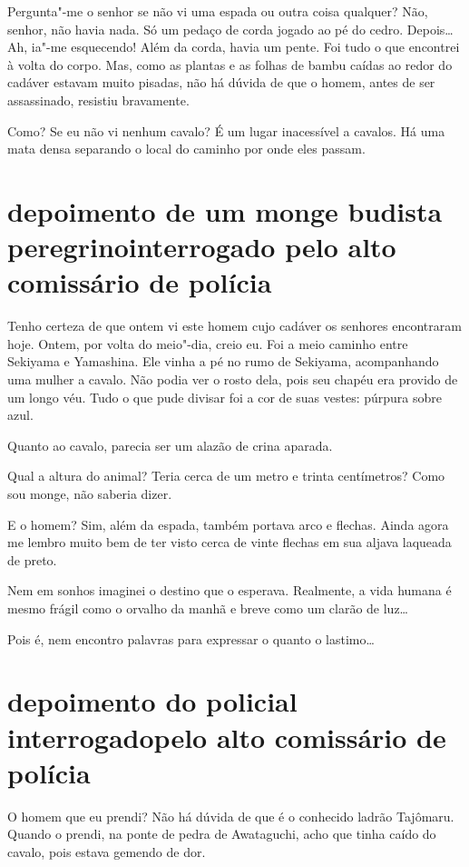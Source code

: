 Pergunta"-me o senhor se não vi uma espada ou outra coisa qualquer? Não,
senhor, não havia nada. Só um pedaço de corda jogado ao pé do cedro.
Depois\ldots{} Ah, ia"-me esquecendo! Além da corda, havia um pente. Foi tudo
o que encontrei à volta do corpo. Mas, como as plantas e as folhas de
bambu caídas ao redor do cadáver estavam muito pisadas, não há dúvida
de que o homem, antes de ser assassinado, resistiu bravamente. 

Como? Se eu não vi nenhum cavalo? É um lugar inacessível a cavalos. Há
uma mata densa separando o local do caminho por onde eles passam.

\section*{depoimento de um monge budista peregrino\break interrogado pelo alto
comissário de polícia}

Tenho certeza de que ontem vi este homem cujo cadáver os senhores
encontraram hoje. Ontem, por volta do meio"-dia, creio eu. Foi a meio
caminho entre Sekiyama e Yamashina. Ele vinha a pé no rumo de Sekiyama,
acompanhando uma mulher a cavalo. Não podia ver o rosto dela, pois seu
chapéu era provido de um longo véu. Tudo o que pude divisar foi a cor
de suas vestes: púrpura sobre azul. 

Quanto ao cavalo, parecia ser um alazão de crina aparada.

Qual a altura do animal? Teria cerca de um metro e trinta centímetros?
Como sou monge, não saberia dizer.

E o homem? Sim, além da espada, também portava arco e flechas. Ainda
agora me lembro muito bem de ter visto cerca de vinte flechas em sua
aljava laqueada de preto.

Nem em sonhos imaginei o destino que o esperava. Realmente, a vida
humana é mesmo frágil como o orvalho da manhã e breve como um clarão de
luz\ldots{} 

Pois é, nem encontro palavras para expressar o quanto o lastimo\ldots{}

\section*{depoimento do policial interrogado\break pelo alto comissário de polícia}

O homem que eu prendi? Não há dúvida de que é o conhecido ladrão
Tajômaru. Quando o prendi, na ponte de pedra de Awataguchi, acho que
tinha caído do cavalo, pois estava gemendo de dor.

